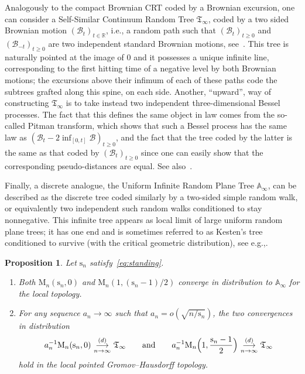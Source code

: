 \documentclass[11pt]{article}
\newcommand{\ie}{i.e.,\xspace}
\newcommand{\eg}{e.g.,\xspace}
\theoremstyle{plain}
\newtheorem{proposition}[theorem]{Proposition}
\theoremstyle{definition}
\theoremstyle{remark}
\newcommand{\R}{\mathbb{R}}
\newcommand{\Map}{\mathrm{M}}
\newcommand{\Tree}{\mathfrak{T}}
\newcommand{\spar}{\mathrm{s}}
\newcommand{\cvloi}[1][n]{\,\mathop{\longrightarrow}^{(d)}_{#1 \to \infty}\,}
\begin{document}
Analogously to the compact Brownian CRT coded by a Brownian excursion, one can consider a Self-Similar Continuum Random Tree $\Tree_\infty$, coded by a two sided Brownian motion $(\mathcal{B}_t)_{t \in \R}$, \ie a random path such that $(\mathcal{B}_t)_{t \ge 0}$ and $(\mathcal{B}_{-t})_{t \ge 0}$ are two independent standard Brownian motions, see~\cite[\S 2.5]{Ald91c}. This tree is naturally pointed at the image of $0$ and it possesses a unique infinite line, corresponding to the first hitting time of a negative level by both Brownian motions; the excursions above their infimum of each of these paths code the subtrees grafted along this spine, on each side. Another, ``upward'', way of constructing $\Tree_\infty$ is to take instead two independent three-dimensional Bessel processes. The fact that this defines the same object in law comes from the so-called Pitman transform, which shows that such a Bessel process has the same law as $(\mathcal{B}_t - 2\inf_{[0,t]} \mathcal{B})_{t \ge 0}$, and the fact that the tree coded by the latter is the same as that coded by $(\mathcal{B}_t)_{t \ge 0}$ since one can easily show that the corresponding pseudo-distances are equal. See also~\cite[\S 7.7.6]{Pit06}.

Finally, a discrete analogue, the Uniform Infinite Random Plane Tree $\mathbb{A}_\infty$, can be described as the discrete tree coded similarly by a two-sided simple random walk, or equivalently two independent such random walks conditioned to stay nonnegative. This infinite tree appears as local limit of large uniform random plane trees; it has one end and is sometimes referred to as Kesten's tree conditioned to survive (with the critical geometric distribution), see \eg \cite[\S 5]{Jan12}.

\begin{proposition}\label{prop:limites_arbres}
Let $\spar_n$ satisfy~\eqref{eq:standing}.
\begin{enumerate}
\item Both $\Map_{n}(\spar_{n},0)$ and $\Map_{n}(1, (\spar_{n}-1)/2)$ converge in distribution to $\mathbb{A}_\infty$ for the local topology.

\item For any sequence $a_n \to \infty$ such that $a_n = o(\sqrt{n/\spar_n})$, the two convergences in distribution
\[
a_n^{-1} \Map_{n}(\spar_{n},0) \cvloi \Tree_\infty
\qquad \text{and} \qquad
a_n^{-1} \Map_{n}\Bigl(1,\frac{\spar_{n}-1}{2} \Bigr) \cvloi \Tree_\infty
\]
hold in the local pointed Gromov--Hausdorff topology.
\end{enumerate}
\end{proposition}
\end{document}
